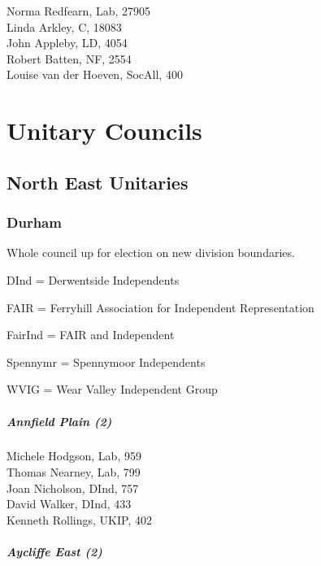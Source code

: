 \documentclass[a4paper,openany,10pt]{book}
\begin{document}


Norma Redfearn, Lab, 27905\\
Linda Arkley, C, 18083\\
John Appleby, LD, 4054\\
Robert Batten, NF, 2554\\
Louise van der Hoeven, SocAll, 400\\


\part{Unitary Councils}

\chapter{North East Unitaries}

\section{Durham}

Whole council up for election on new division boundaries.

DInd = Derwentside Independents

FAIR = Ferryhill Association for Independent Representation

FairInd = FAIR and Independent

Spennymr = Spennymoor Independents

WVIG = Wear Valley Independent Group



\subsubsection*{Annfield Plain (2)}



Michele Hodgson, Lab, 959\\
Thomas Nearney, Lab, 799\\
Joan Nicholson, DInd, 757\\
David Walker, DInd, 433\\
Kenneth Rollings, UKIP, 402\\


\subsubsection*{Aycliffe East (2)}
\end{document}
